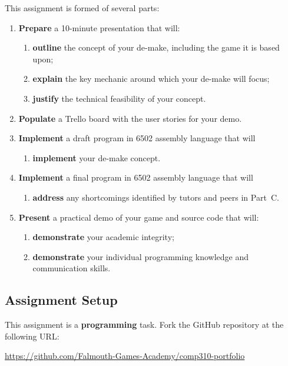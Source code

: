 \documentclass{../../fal_assignment}
\begin{document}
This assignment is formed of several parts:
\begin{enumerate}[label=(\Alph*)]
	\item \textbf{Prepare} a 10-minute presentation that will:
		\begin{enumerate}[label=(\roman*)]
			\item \textbf{outline} the concept of your de-make, including the game it is based upon;
			\item \textbf{explain} the key mechanic around which your de-make will focus;
			\item \textbf{justify} the technical feasibility of your concept.
		\end{enumerate}
	\item \textbf{Populate} a Trello board with the user stories for your demo.
	\item \textbf{Implement} a draft program in 6502 assembly language that will
		\begin{enumerate}[label=(\roman*)]
			\item \textbf{implement} your de-make concept.
		\end{enumerate}
	\item \textbf{Implement} a final program in 6502 assembly language that will
		\begin{enumerate}[label=(\roman*)]
			\item \textbf{address} any shortcomings identified by tutors and peers in Part~C.
		\end{enumerate}
	\item \textbf{Present} a practical demo of your game and source code that will:
		\begin{enumerate}[label=(\roman*)]
			\item \textbf{demonstrate} your academic integrity;
			\item \textbf{demonstrate} your individual programming knowledge and communication skills.
		\end{enumerate}
\end{enumerate}

\subsection*{Assignment Setup}

This assignment is a \textbf{programming} task. Fork the GitHub repository at the following URL:

\indent \url{https://github.com/Falmouth-Games-Academy/comp310-portfolio}
\end{document}
